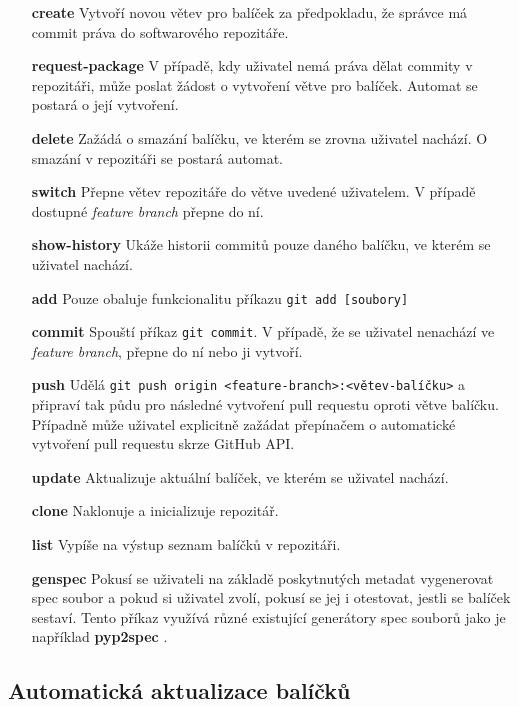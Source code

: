 \documentclass[
  digital,     %
  oneside,     %
  nosansbold,  %
  nocolorbold, %
  lof,         %
  lot,         %
]{fithesis4}
\begin{document}
\begin{itemize}
    \item[\textbf{create}] Vytvoří novou větev pro balíček za
    předpokladu, že správce má commit práva do softwarového repozitáře.
    \item[\textbf{request-package}] V případě, kdy uživatel nemá práva
    dělat commity v repozitáři, může poslat žádost o vytvoření
    větve pro balíček. Automat se postará o její vytvoření.
    \item[\textbf{delete}] Zažádá o smazání balíčku, ve kterém se
    zrovna uživatel nachází. O smazání v repozitáři se postará automat.
    \item[\textbf{switch}] Přepne větev repozitáře do větve uvedené 
    uživatelem. V případě dostupné \textit{feature branch} přepne do ní.
    \item[\textbf{show-history}] Ukáže historii commitů pouze daného
    balíčku, ve kterém se uživatel nachází.
    \item[\textbf{add}] Pouze obaluje funkcionalitu příkazu 
    \texttt{git add [soubory]}
    \item[\textbf{commit}] Spouští příkaz \texttt{git commit}. V
    případě, že se uživatel nenachází ve \textit{feature branch},
    přepne do ní nebo ji vytvoří.
    \item[\textbf{push}] Udělá \texttt{git push origin
    <feature-branch>:<větev-balíčku>} a připraví tak půdu pro
    následné vytvoření pull requestu oproti větve balíčku. Případně
    může uživatel explicitně zažádat přepínačem o automatické
    vytvoření pull requestu skrze GitHub API.
    \item[\textbf{update}] Aktualizuje aktuální balíček, ve kterém
    se uživatel nachází.
    \item[\textbf{clone}] Naklonuje a inicializuje repozitář.
    \item[\textbf{list}] Vypíše na výstup seznam balíčků v repozitáři.
    \item[\textbf{genspec}] Pokusí se uživateli na základě poskytnutých
    metadat vygenerovat spec soubor a pokud si uživatel zvolí, pokusí
    se jej i otestovat, jestli se balíček sestaví. Tento příkaz využívá
    různé existující generátory spec souborů jako je například
    \textbf{pyp2spec} \cite{pyp2spec}.
\end{itemize}


\subsection{Automatická aktualizace balíčků}
\end{document}
